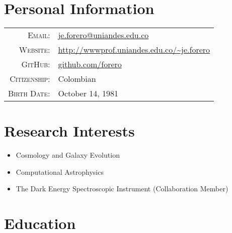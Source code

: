 \documentclass[a4paper,10pt]{article} %
\begin{document}
\pagestyle{empty} %




\par{ \bigskip\par} %

\color{red}
\section{Personal Information}
\color{black}


\begin{tabular}{rl}
\textsc{Email:} & \href{mailto:je.forero@uniandes.edu.co}{je.forero@uniandes.edu.co}\\
\textsc{Website:} & \url{http://wwwprof.uniandes.edu.co/~je.forero}\\
\textsc{GitHub:} & \url{github.com/forero}\\
\textsc{Citizenship:} & Colombian\\
\textsc{Birth Date:} & October 14, 1981\\
\end{tabular}



\color{red}
\section{Research Interests}
\color{black}
\begin{itemize}
\item{Cosmology and Galaxy Evolution}
\item{Computational Astrophysics}
\item{The Dark Energy Spectroscopic Instrument (Collaboration Member)}
\end{itemize}


\color{red}
\section{Education}
\color{black}
\end{document}
